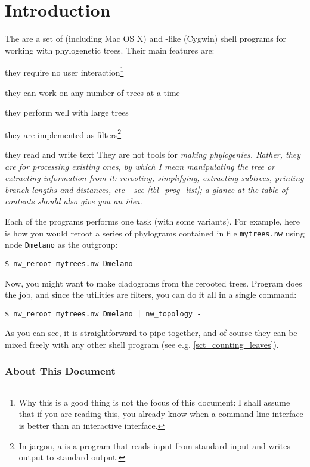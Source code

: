 \chapter{Introduction}

The \nutils{} are a set of \unix{} (including Mac OS X) and \unix-like (Cygwin) shell programs for working with phylogenetic trees. Their main features are:
\startitemize
 \item they require no user interaction\footnote{Why this is a good thing is not the focus of this document: I shall assume that if you are reading this, you already know when a command-line interface is better than an interactive interface.}
 \item they can work on any number of trees at a time
 \item they perform well with large trees
 \item they are implemented as filters\footnote{In \unix{} jargon, a
  is a program that reads input from standard input and writes
 output to standard output.}
 \item they read and write text
\stopitemize
They are not tools for \em{making} phylogenies. Rather, they are for
processing existing ones, by which I mean manipulating the tree or extracting
information from it: rerooting, simplifying, extracting subtrees, printing
branch lengths and distances, etc - see [tbl_prog_list]; a glance
at the table of contents should also give you an idea.

Each of the programs performs one task (with some variants). For example, here
is how you would reroot a series of phylograms contained in file
\texttt{mytrees.nw} using node \texttt{Dmelano} as the outgroup:

\begin{verbatim}
$ nw_reroot mytrees.nw Dmelano
\end{verbatim} 
Now, you might want to make cladograms from the rerooted trees. Program
\topology{} does the job, and since the utilities are filters, you can do it
all in a single command:
\begin{verbatim}
$ nw_reroot mytrees.nw Dmelano | nw_topology -
\end{verbatim}
As you can see, it is straightforward to pipe \nutils{} together, and of course they can be mixed freely with any other shell program (see e.g. \ref{sct_counting_leaves}).

\subsection*{About This Document}

